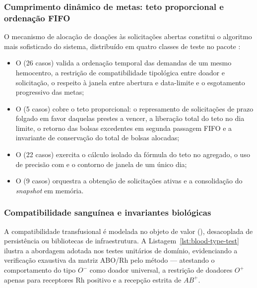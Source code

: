 \subsubsection{Cumprimento dinâmico de metas: teto proporcional e ordenação FIFO}

O mecanismo de alocação de doações às solicitações abertas constitui o algoritmo mais sofisticado do sistema, distribuído em quatro classes de teste no pacote :
\begin{itemize}[noitemsep,topsep=2pt]
  \item O  (26 casos) valida a ordenação temporal das demandas de um mesmo hemocentro, a restrição de compatibilidade tipológica entre doador e solicitação, o respeito à janela entre abertura e data-limite e o esgotamento progressivo das metas;
  \item O  (5 casos) cobre o teto proporcional: o represamento de solicitações de prazo folgado em favor daquelas prestes a vencer, a liberação total do teto no dia limite, o retorno das bolsas excedentes em segunda passagem FIFO e a invariante de conservação do total de bolsas alocadas;
  \item O  (22 casos) exercita o cálculo isolado da fórmula do teto no agregado, o uso de precisão com  e o contorno de janela de um único dia;
  \item O  (9 casos) orquestra a obtenção de solicitações ativas e a consolidação do \textit{snapshot} em memória.
\end{itemize}

\subsubsection{Compatibilidade sanguínea e invariantes biológicas}

A compatibilidade transfusional é modelada no objeto de valor  (), desacoplada de persistência ou bibliotecas de infraestrutura. A Listagem~\ref{lst:blood-type-test} ilustra a abordagem adotada nos testes unitários de domínio, evidenciando a verificação exaustiva da matriz ABO/Rh pelo método  --- atestando o comportamento do tipo $O^-$ como doador universal, a restrição de doadores $O^+$ apenas para receptores Rh positivo e a recepção estrita de $AB^+$.

